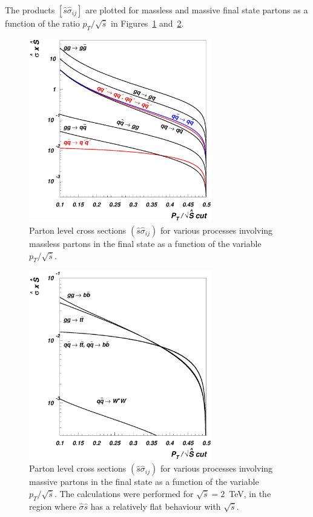 \documentclass[12pt]{iopart}
\begin{document}
The products $\left[\hat{s}\hat{\sigma}_{ij}\right]$ are plotted for massless and massive final state partons as
a function of the ratio $p_T/\sqrt{\hat{s}}$ in Figures~\ref{fig:sigma_d} and~\ref{fig:sigmah_d}.
%
\begin{figure}[t]
\begin{center}
\includegraphics[width=8cm]{sigma_d.eps}
\end{center}
\caption{
Parton level cross sections
$\left(\hat{s}\hat{\sigma}_{ij}\right)$
for various processes involving massless partons in the final state as a function of the variable $p_T/\sqrt{\hat{s}}$. 
} 
\label{fig:sigma_d}
\end{figure}
%
%
\begin{figure}[t]
\begin{center}
\includegraphics[width=8cm]{sigmah_d.eps}
\end{center}
\caption{
Parton level cross sections
$\left(\hat{s}\hat{\sigma}_{ij}\right)$
for various processes involving massive partons in the final state as a function of the variable
$p_T/\sqrt{\hat{s}}$. The calculations were performed  for $\sqrt{\hat{s}} = 2$~TeV, in the region
where $\hat{\sigma}\hat{s}$ has a relatively flat behaviour with $\sqrt{\hat{s}}$.
} 
\label{fig:sigmah_d}
\end{figure}
\end{document}
